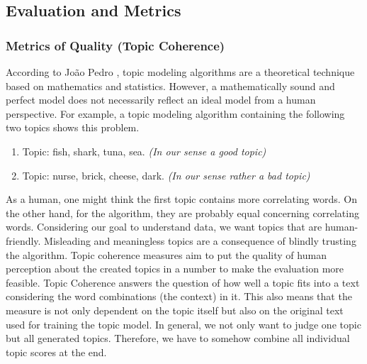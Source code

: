 \subsection{Evaluation and Metrics}
\subsubsection{Metrics of Quality (Topic Coherence)}\label{sec:coherence}
According to João Pedro \cite{topiccoherencemeasures}, topic modeling algorithms are a theoretical technique based on mathematics and statistics. However, a mathematically sound and perfect model does not necessarily reflect an ideal model from a human perspective. For example, a topic modeling algorithm containing the following two topics shows this problem.
\begin{enumerate}
    \item Topic: fish, shark, tuna, sea. \textit{(In our sense a good topic)}
    \item Topic: nurse, brick, cheese, dark. \textit{(In our sense rather a bad topic)}
\end{enumerate}
As a human, one might think the first topic contains more correlating words. On the other hand, for the algorithm, they are probably equal concerning correlating words. Considering our goal to understand data, we want topics that are human-friendly. Misleading and meaningless topics are a consequence of blindly trusting the algorithm. Topic coherence measures aim to put the quality of human perception about the created topics in a number to make the evaluation more feasible. Topic Coherence answers the question of how well a topic fits into a text considering the word combinations (the context) in it. This also means that the measure is not only dependent on the topic itself but also on the original text used for training the topic model. In general, we not only want to judge one topic but all generated topics. Therefore, we have to somehow combine all individual topic scores at the end. 

